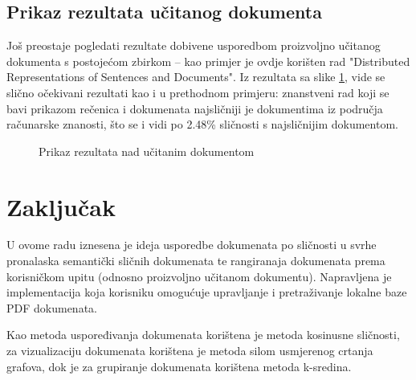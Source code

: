 \documentclass[times, utf8, zavrsni, numeric]{fer}
\begin{document}
\section{Prikaz rezultata učitanog dokumenta}

Još preostaje pogledati rezultate dobivene usporedbom proizvoljno učitanog dokumenta s postojećom zbirkom -- kao primjer je ovdje korišten rad "Distributed Representations of Sentences and Documents". Iz rezultata sa slike \ref{img:document_query}, vide se slično očekivani rezultati kao i u prethodnom primjeru: znanstveni rad koji se bavi prikazom rečenica i dokumenata najsličniji je dokumentima iz područja računarske znanosti, što se i vidi po 2.48\% sličnosti s najsličnijim dokumentom.

\begin{figure}
\caption{Prikaz rezultata nad učitanim dokumentom}
\label{img:document_query}
\end{figure}

\chapter{Zaključak}
U ovome radu iznesena je ideja usporedbe dokumenata po sličnosti u svrhe pronalaska semantički sličnih dokumenata te rangiranaja dokumenata prema korisničkom upitu (odnosno proizvoljno učitanom dokumentu). Napravljena je implementacija koja korisniku omogućuje upravljanje i pretraživanje lokalne baze PDF dokumenata.

Kao metoda uspoređivanja dokumenata korištena je metoda kosinusne sličnosti, za vizualizaciju dokumenata korištena je metoda silom usmjerenog crtanja grafova, dok je za grupiranje dokumenata korištena metoda k-sredina.
\end{document}
